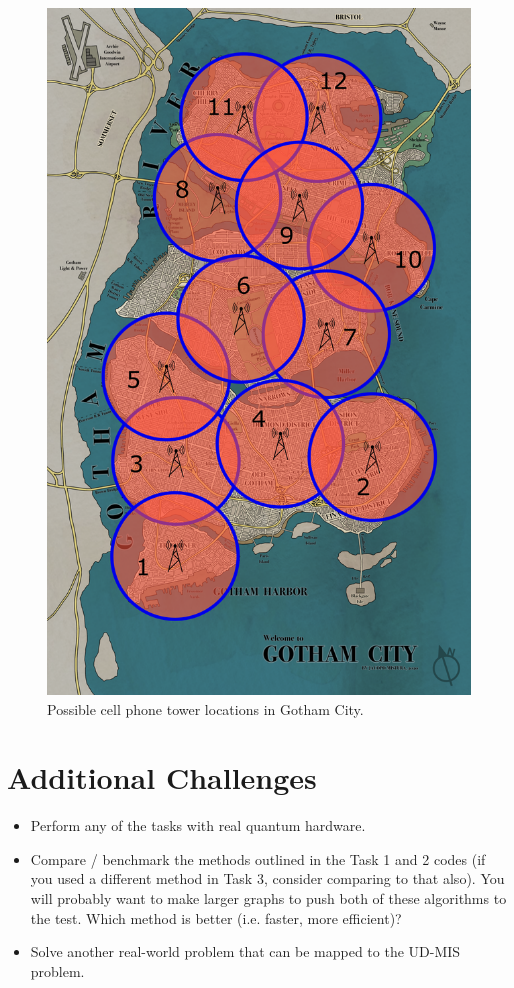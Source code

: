 \documentclass[12pt]{article}
\begin{document}
\begin{figure}
    \begin{center}
        \includegraphics[width=0.4\linewidth]{images/gothamcity.png}
    \end{center}
    \caption{Possible cell phone tower locations in Gotham City.} \label{fig:gotham}
\end{figure}

\section*{Additional Challenges}

\begin{itemize}
	\item Perform any of the tasks with real quantum hardware.
	\item Compare / benchmark the methods outlined in the Task 1 and 2 codes (if you used a different method in Task 3, consider comparing to that also). You will probably want to make larger graphs to push both of these algorithms to the test. Which method is better (i.e. faster, more efficient)?
	\item Solve another real-world problem that can be mapped to the UD-MIS problem.
\end{itemize}



\end{document}
